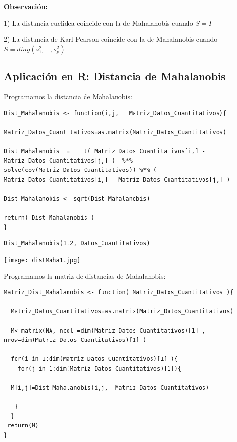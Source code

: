 \documentclass[12pt]{report} %
\begin{document}
\textbf{Observación:}

1)\hspace{0.1cm} La distancia euclidea coincide con la de Mahalanobis cuando $S=I$ 

2)\hspace{0.1cm} La distancia de Karl Pearson coincide con la de Mahalanobis cuando $S=diag(s_1^2 ,..., s_p^2)$


\newpage

\subsection{Aplicación en R: Distancia de Mahalanobis}

Programamos la distancia de Mahalanobis:

\begin{lstlisting}
Dist_Mahalanobis <- function(i,j,   Matriz_Datos_Cuantitativos){
  
Matriz_Datos_Cuantitativos=as.matrix(Matriz_Datos_Cuantitativos)  

Dist_Mahalanobis  =    t( Matriz_Datos_Cuantitativos[i,] - Matriz_Datos_Cuantitativos[j,] )  %*% solve(cov(Matriz_Datos_Cuantitativos)) %*% ( Matriz_Datos_Cuantitativos[i,] - Matriz_Datos_Cuantitativos[j,] ) 
  
Dist_Mahalanobis <- sqrt(Dist_Mahalanobis)

return( Dist_Mahalanobis )
}

\end{lstlisting}


\begin{lstlisting}
Dist_Mahalanobis(1,2, Datos_Cuantitativos)
\end{lstlisting}

\texttt{[image: distMaha1.jpg]}


Programamos la matriz de distancias de Mahalanobis:

\begin{lstlisting}
Matriz_Dist_Mahalanobis <- function( Matriz_Datos_Cuantitativos ){
  
  Matriz_Datos_Cuantitativos=as.matrix(Matriz_Datos_Cuantitativos)
  
  M<-matrix(NA, ncol =dim(Matriz_Datos_Cuantitativos)[1] , nrow=dim(Matriz_Datos_Cuantitativos)[1] )
  
  for(i in 1:dim(Matriz_Datos_Cuantitativos)[1] ){
    for(j in 1:dim(Matriz_Datos_Cuantitativos)[1]){
    
  M[i,j]=Dist_Mahalanobis(i,j,  Matriz_Datos_Cuantitativos)
  
   }
  }
 return(M)
}
\end{lstlisting}
\end{document}
